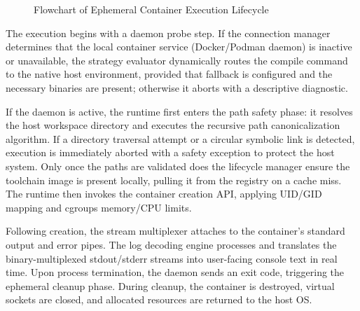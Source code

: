 \begin{figure}[htbp]
    \caption{Flowchart of Ephemeral Container Execution Lifecycle}
    \label{fig:lifecycle_flowchart}
\end{figure}

The execution begins with a daemon probe step. If the connection manager determines that the local container service (Docker/Podman daemon) is inactive or unavailable, the strategy evaluator dynamically routes the compile command to the native host environment, provided that fallback is configured and the necessary binaries are present; otherwise it aborts with a descriptive diagnostic.

If the daemon is active, the runtime first enters the path safety phase: it resolves the host workspace directory and executes the recursive path canonicalization algorithm. If a directory traversal attempt or a circular symbolic link is detected, execution is immediately aborted with a safety exception to protect the host system. Only once the paths are validated does the lifecycle manager ensure the toolchain image is present locally, pulling it from the registry on a cache miss. The runtime then invokes the container creation API, applying UID/GID mapping and cgroups memory/CPU limits.

Following creation, the stream multiplexer attaches to the container's standard output and error pipes. The log decoding engine processes and translates the binary-multiplexed stdout/stderr streams into user-facing console text in real time. Upon process termination, the daemon sends an exit code, triggering the ephemeral cleanup phase. During cleanup, the container is destroyed, virtual sockets are closed, and allocated resources are returned to the host OS.

